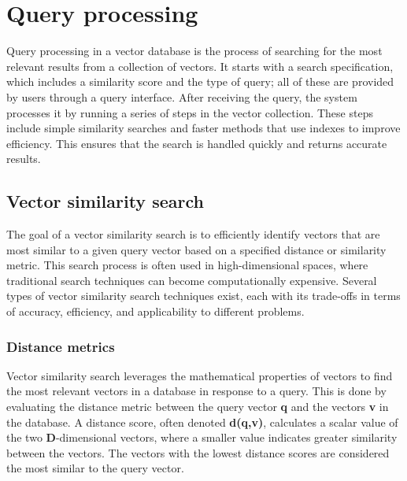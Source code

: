 \pagestyle{fancy}
\chapter{Query processing}
\label{chap:Query processing}
\pagestyle{fancy}

Query processing in a vector database is the process of searching for the most relevant results from a collection of vectors. It starts with a search specification, which includes a similarity score and the type of query; all of these are provided by users through a query interface.
After receiving the query, the system processes it by running a series of steps in the vector collection. These steps include simple similarity searches and faster methods that use indexes to improve efficiency. This ensures that the search is handled quickly and returns accurate results.
\section{Vector similarity search}
The goal of a vector similarity search is to efficiently identify vectors that are most similar to a given query vector based on a specified distance or similarity metric. This search process is often used in high-dimensional spaces, where traditional search techniques can become computationally expensive. Several types of vector similarity search techniques exist, each with its trade-offs in terms of accuracy, efficiency, and applicability to different problems.
\subsection{Distance metrics}
Vector similarity search leverages the mathematical properties of vectors to find the most relevant vectors in a database in response to a query. This is done by evaluating the distance metric between the query vector \textbf{q} and the vectors \textbf{v} in the database. A distance score, often denoted \textbf{d(q,v)}, calculates a scalar value of the two \textbf{D}-dimensional vectors, where a smaller value indicates greater similarity between the vectors. The vectors with the lowest distance scores are considered the most similar to the query vector.

